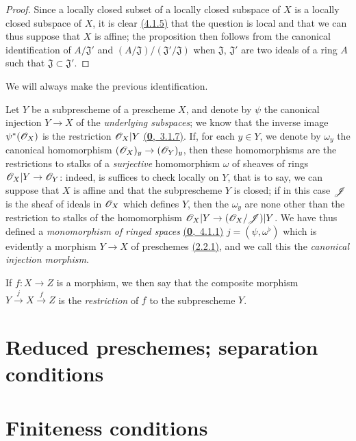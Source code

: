 \begin{proof}
\label{proof-prop-1.4.1.6}
Since a locally closed subset of a locally closed subspace of $X$ is a locally closed
subspace of $X$, it is clear \hyperref[prop-1.4.1.5]{(4.1.5)} that the question is local
and that we can thus suppose that $X$ is affine; the proposition then follows from the
canonical identification of $A/\mathfrak{J}'$ and
$(A/\mathfrak{J})/(\mathfrak{J}'/\mathfrak{J})$ when $\mathfrak{J}$, $\mathfrak{J}'$ are
two ideals of a ring $A$ such that $\mathfrak{J}\subset\mathfrak{J}'$.
\end{proof}

We will always make the previous identification.
\begin{env}[4.1.7]
\label{env-1.4.1.7}
Let $Y$ be a subprescheme of a prescheme $X$, and denote by $\psi$ the canonical injection
$Y\to X$ of the {\em underlying subspaces}; we know that the inverse image $\psi^*(\mathscr{O}_X)$ is
the restriction $\mathscr{O}_X|Y$ \hyperref[env-0.3.7.1]{(\textbf{0},~3.1.7)}. If, for each $y\in Y$,
we denote by $\omega_y$ the canonical homomorphism $(\mathscr{O}_X)_y\to(\mathscr{O}_Y)_y$, then these
homomorphisms are the restrictions to stalks of a {\em surjective} homomorphism $\omega$
of sheaves of rings $\mathscr{O}_X|Y\to\mathscr{O}_Y$: indeed, is suffices to check locally on $Y$, that is
to say, we can suppose that $X$ is affine and that the subprescheme $Y$ is closed; if in this
case $\mathscr{J}$ is the sheaf of ideals in $\mathscr{O}_X$ which defines $Y$, then the $\omega_y$ are
none other than the restriction to stalks of the homomorphism $\mathscr{O}_X|Y\to(\mathscr{O}_X/\mathscr{J})|Y$.
We have thus defined a
{\em monomorphism of ringed spaces} \hyperref[env-0.4.1.1]{(\textbf{0},~4.1.1)}
$j=(\psi,\omega^\flat)$ which is evidently a morphism $Y\to X$ of
preschemes \hyperref[defn-1.2.2.1]{(2.2.1)}, and we call this the
{\em canonical injection morphism}.

If $f:X\to Z$ is a morphism, we then say that the composite morphism
$Y\xrightarrow{j}X\xrightarrow{f}Z$ is the {\em restriction} of $f$ to the subprescheme $Y$.
\end{env}

\section{Reduced preschemes; separation conditions}
\label{section-reduced-preschemes-and-separation-conditions}

\section{Finiteness conditions}
\label{section-finiteness-conditions}

